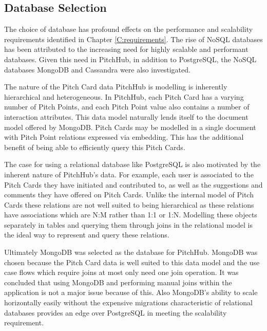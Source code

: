 \subsection{Database Selection}\label{SS:databaseSelection}

The choice of database has profound effects on the performance and scalability requirements identified in Chapter \ref{C:requirements}. The rise of NoSQL databases has been attributed to the increasing need for highly scalable and performant databases. Given this need in PitchHub, in addition to PostgreSQL, the NoSQL databases MongoDB and Cassandra were also investigated.
\par
The nature of the Pitch Card data PitchHub is modelling is inherently hierarchical and heterogeneous. In PitchHub, each Pitch Card has a varying number of Pitch Points, and each Pitch Point value also contains a number of interaction attributes. This data model naturally lends itself to the document model offered by MongoDB. Pitch Cards may be modelled in a single document with Pitch Point relations expressed via embedding. This has the additional benefit of being able to efficiently query this Pitch Cards.
\par
The case for using a relational database like PostgreSQL is also motivated by the inherent nature of PitchHub's data. For example, each user is associated to the Pitch Cards they have initiated and contributed to, as well as the suggestions and comments they have offered on Pitch Cards. Unlike the internal model of Pitch Cards these relations are not well suited to being hierarchical as these relations have associations which are N:M rather than 1:1 or 1:N. Modelling these objects separately in tables and querying them through joins in the relational model is the ideal way to represent and query these relations.
\par
Ultimately MongoDB was selected as the database for PitchHub. MongoDB was chosen because the Pitch Card data is well suited to this data model and the use case flows which require joins at most only need one join operation. It was concluded that using MongoDB and performing manual joins within the application is not a major issue because of this. Also MongoDB's ability to scale horizontally easily without the expensive migrations characteristic of relational databases provides an edge over PostgreSQL in meeting the scalability requirement.
